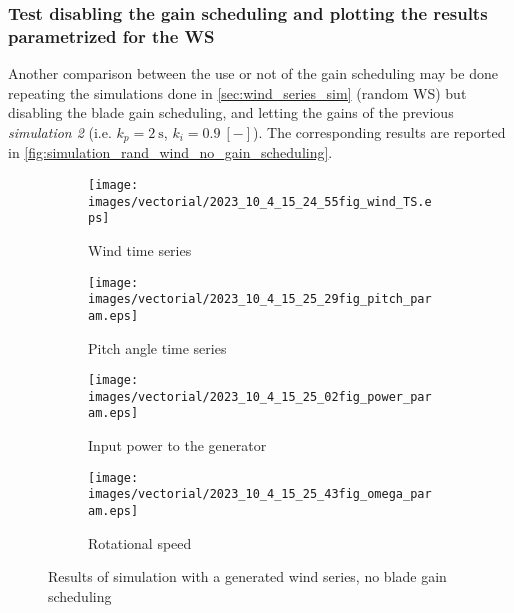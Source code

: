 \subsubsection[Parametrization with respect to the wind speed]{Test disabling the gain scheduling and plotting the results parametrized for the WS}\label{subsec:gain_disabled}
Another comparison between the use or not of the gain scheduling may be done repeating the simulations done in \autoref{sec:wind_series_sim} (random WS) but disabling the blade gain scheduling, and letting the gains of the previous \textit{simulation 2} (i.e. $k_p = 2 \ \si{\second}$, $k_i=0.9 \ [-]$). The corresponding results are reported in \autoref{fig:simulation_rand_wind_no_gain_scheduling}.
\begin{figure}[htb]
  \begin{subfigure}{0.5\columnwidth}
    \centering
    \texttt{[image: images/vectorial/2023\_10\_4\_15\_24\_55fig\_wind\_TS.eps]}
    \caption{Wind time series}
    \label{fig:2023_05_8_22_43_35fig_wind_TS.eps}
  \end{subfigure}
  \begin{subfigure}{0.5\columnwidth}
    \centering
    \texttt{[image: images/vectorial/2023\_10\_4\_15\_25\_29fig\_pitch\_param.eps]}
    \caption{Pitch angle time series}
    \label{fig:2023_05_8_22_44_05fig_pitch_param}
  \end{subfigure}
  \begin{subfigure}{0.5\columnwidth}
    \centering
    \texttt{[image: images/vectorial/2023\_10\_4\_15\_25\_02fig\_power\_param.eps]}
    \caption{Input power to the generator}
    \label{fig:2023_05_8_22_44_15fig_power_param}
  \end{subfigure}
  \begin{subfigure}{0.5\columnwidth}
    \centering
    \texttt{[image: images/vectorial/2023\_10\_4\_15\_25\_43fig\_omega\_param.eps]}
    \caption{Rotational speed}
    \label{fig:2023_05_8_23_17_57fig_omega_param}
  \end{subfigure}
  \caption{Results of simulation with a generated wind series, no blade gain scheduling}
  \label{fig:simulation_rand_wind_no_gain_scheduling}
\end{figure}


